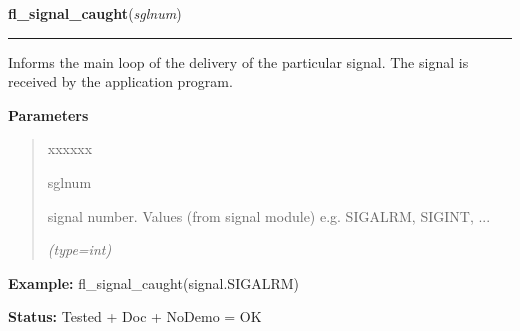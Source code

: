     \label{xformslib:flbasic:fl_signal_caught}

    \vspace{0.5ex}

\hspace{.8\funcindent}\begin{boxedminipage}{\funcwidth}

    \raggedright \textbf{fl\_signal\_caught}(\textit{sglnum})

    \vspace{-1.5ex}

    \rule{\textwidth}{0.5\fboxrule}
\setlength{\parskip}{2ex}
    Informs the main loop of the delivery of the particular signal. The 
    signal is received by the application program.

\setlength{\parskip}{1ex}
      \textbf{Parameters}
      \vspace{-1ex}

      \begin{quote}
        \begin{Ventry}{xxxxxx}

          \item[sglnum]

          signal number. Values (from signal module) e.g. SIGALRM, SIGINT, 
          ...

            {\it (type=int)}

        \end{Ventry}

      \end{quote}

\textbf{Example:} fl\_signal\_caught(signal.SIGALRM)



\textbf{Status:} Tested + Doc + NoDemo = OK



    \end{boxedminipage}

    \label{xformslib:flbasic:fl_app_signal_direct}

    \vspace{0.5ex}

